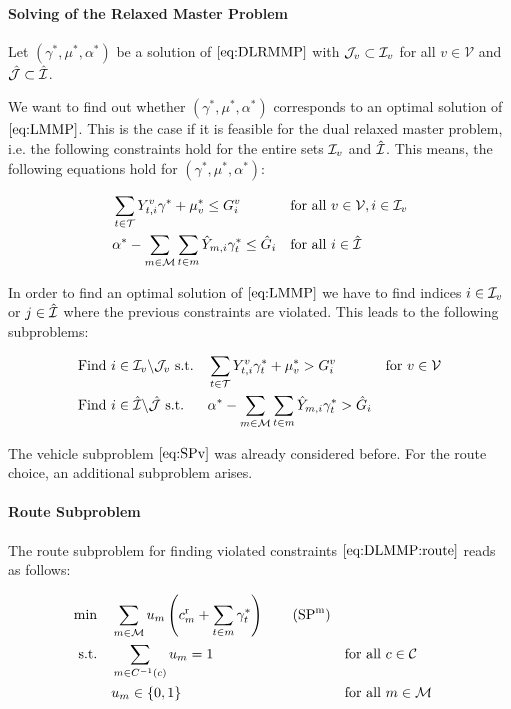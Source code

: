 \paragraph{Solving of the Relaxed Master Problem} \parfill

Let $\left(\gamma^*,\mu^*,\alpha^*\right)$ be a solution of $\eqref{eq:DLRMMP}$ with $\mathcal{J}_v\subset\mathcal{I}_v$ for all $v\in\mathcal{V}$ and $\hat{\mathcal{J}}\subset\hat{\mathcal{I}}$. 

We want to find out whether $\left(\gamma^*,\mu^*,\alpha^*\right)$ corresponds to an optimal solution of $\eqref{eq:LMMP}$. This is the case if it is feasible for the dual relaxed master problem, i.e. the following constraints hold for the entire sets $\mathcal{I}_v$ and $\hat{\mathcal{I}}$. This means, the following equations hold for $\left(\gamma^*,\mu^*,\alpha^*\right)$:

\begin{align}
	& \sum_{t\in\mathcal{T}} Y^v_{t,i}\gamma^* + \mu^*_v \leq G^v_i && \text{for all } v\in\mathcal{V},i\in\mathcal{I}_v \label{eq:DLMMP:vehicle} \\
	& \alpha^* - \sum_{m\in\mathcal{M}}\sum_{t\in m}\hat{Y}_{m,i}\gamma^*_t \leq \hat{G}_i && \text{for all } i\in\hat{\mathcal{I}} \label{eq:DLMMP:route}
\end{align}

In order to find an optimal solution of $\eqref{eq:LMMP}$ we have to find indices $i\in\mathcal{I}_v$ or $j\in\hat{\mathcal{I}}$ where the previous constraints are violated. This leads to the following subproblems:

\begin{align*}
	& \text{Find } i\in\mathcal{I}_v\backslash\mathcal{J}_v \text{ s.t.} && \sum_{t\in\mathcal{T}}Y^v_{t,i}\gamma^*_t + \mu^*_v > G^v_i && \text{for } v\in\mathcal{V} \\
	& \text{Find } i\in\hat{\mathcal{I}}\backslash\hat{\mathcal{J}} \text{ s.t.} && \alpha^*-\sum_{m\in\mathcal{M}}\sum_{t\in m}\hat{Y}_{m,i}\gamma^*_t > \hat{G}_i
\end{align*}

The vehicle subproblem $\eqref{eq:SPv}$ was already considered before. For the route choice, an additional subproblem arises.

\paragraph{Route Subproblem} \parfill

The route subproblem for finding violated constraints $\eqref{eq:DLMMP:route}$ reads as follows:

\begin{align*}
	\min \quad & \sum_{m\in\mathcal{M}}u_m\left(\croute_m + \sum_{t\in m}\gamma^*_t\right) \tag{$\SPm$} \label{SPm} \\
	\text{s.t.} \quad & \sum_{m\in C^{-1}(c)}u_m = 1 && \text{for all } c\in\mathcal{C} \\
	& u_m\in\{0,1\} && \text{for all } m\in\mathcal{M}
\end{align*}


